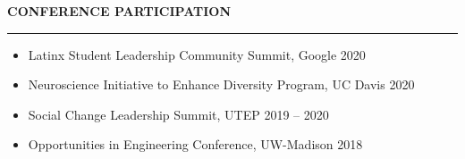 \documentclass[12pt]{article}
\newcommand{\sectionheading}[1]{%
    \vspace{1.2ex}%
    {\large\bfseries\MakeUppercase{#1}}\par\vspace{0.3ex}%
    {\color[gray]{0.6}\rule{0.98\linewidth}{0.3pt}}\vspace{0.6ex}%
  }
\newcommand{\sectionheading}[1]{%
    \vspace{1.2ex}%
    {\large\bfseries{\SansHead \MakeUppercase{#1}}}\par\vspace{0.3ex}%
    {\color[gray]{0.6}\rule{0.98\linewidth}{0.3pt}}\vspace{0.6ex}%
  }
\begin{document}
\sectionheading{Conference Participation}

\begin{itemize}
  \item Latinx Student Leadership Community Summit, Google \hfill 2020
  \item Neuroscience Initiative to Enhance Diversity Program, UC Davis \hfill 2020
  \item Social Change Leadership Summit, UTEP \hfill 2019 -- 2020
  \item Opportunities in Engineering Conference, UW-Madison \hfill 2018
\end{itemize}
\end{document}
